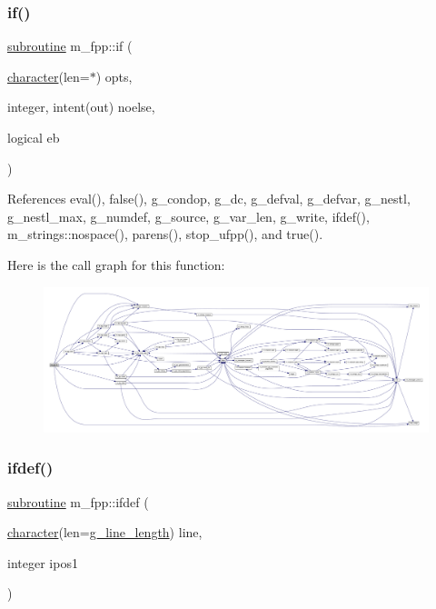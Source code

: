 \subsubsection{\texorpdfstring{if()}{if()}}
{\footnotesize\ttfamily \hyperlink{M__stopwatch_83_8txt_acfbcff50169d691ff02d4a123ed70482}{subroutine} m\+\_\+fpp\+::if (\begin{DoxyParamCaption}\item[{\hyperlink{option__stopwatch_83_8txt_abd4b21fbbd175834027b5224bfe97e66}{character}(len=$\ast$)}]{opts,  }\item[{integer, intent(out)}]{noelse,  }\item[{logical}]{eb }\end{DoxyParamCaption})}



References eval(), false(), g\+\_\+condop, g\+\_\+dc, g\+\_\+defval, g\+\_\+defvar, g\+\_\+nestl, g\+\_\+nestl\+\_\+max, g\+\_\+numdef, g\+\_\+source, g\+\_\+var\+\_\+len, g\+\_\+write, ifdef(), m\+\_\+strings\+::nospace(), parens(), stop\+\_\+ufpp(), and true().

Here is the call graph for this function\+:
\nopagebreak
\begin{figure}[H]
\begin{center}
\leavevmode
\includegraphics[width=350pt]{namespacem__fpp_a4866adfbe17fb5cc245f2ad058bb47f2_cgraph}
\end{center}
\end{figure}
\mbox{\label{namespacem__fpp_acc125ade915dbf457a06801f2e241306}} 
\subsubsection{\texorpdfstring{ifdef()}{ifdef()}}
{\footnotesize\ttfamily \hyperlink{M__stopwatch_83_8txt_acfbcff50169d691ff02d4a123ed70482}{subroutine} m\+\_\+fpp\+::ifdef (\begin{DoxyParamCaption}\item[{\hyperlink{option__stopwatch_83_8txt_abd4b21fbbd175834027b5224bfe97e66}{character}(len=\hyperlink{namespacem__fpp_ab93f8756cf248cf8db932573009d4664}{g\+\_\+line\+\_\+length})}]{line,  }\item[{integer}]{ipos1 }\end{DoxyParamCaption})}



